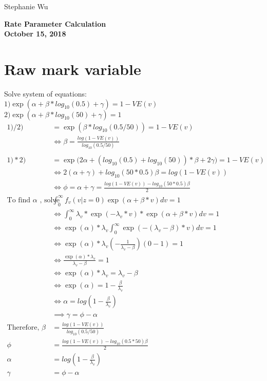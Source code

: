 \documentclass[10pt, letter]{article}
\begin{document}
\begin{flushleft}
\large{Stephanie Wu}
\end{flushleft}
\begin{center}
\large\textbf{Rate Parameter Calculation\\
October 15, 2018\\}
\end{center}

\section{Raw mark variable}
Solve system of equations:\\ 
$1) \exp(\alpha + \beta*log_{10}(0.5) + \gamma) = 1 - VE(v)$\\
$2) \exp(\alpha + \beta*log_{10}(50) + \gamma) = 1$\\
\begin{align*}
1)/ 2) &= \exp(\beta*log_{10}(0.5/50)) = 1-VE(v)\\
&\iff \beta = \frac{log(1-VE(v))}{log_{10}(0.5/50)}\\
\\
1)*2) &= \exp\Big(2\alpha + (log_{10}(0.5)+log_{10}(50))*\beta + 2\gamma\Big) = 1-VE(v)\\
&\iff 2(\alpha + \gamma) + log_{10}(50*0.5)\beta = log(1-VE(v))\\
&\iff \phi = \alpha + \gamma = \frac{log(1-VE(v)) - log_{10}(50*0.5)\beta}{2}\\
\text{To find } \alpha \text{ , solve } &\int_0^\infty f_v(v|z=0)\exp(\alpha+\beta*v)dv = 1\\
&\iff \int_0^\infty \lambda_v* \exp(-\lambda_v*v)*\exp(\alpha + \beta*v)dv = 1\\
&\iff \exp(\alpha)*\lambda_v \int_0^\infty\exp(-(\lambda_v - \beta)*v)dv = 1\\
&\iff \exp(\alpha)*\lambda_v (-\frac{1}{\lambda_v - \beta})(0 - 1) = 1\\
&\iff \frac{\exp(\alpha)*\lambda_v}{\lambda_v - \beta} = 1\\
&\iff \exp(\alpha)*\lambda_v = \lambda_v - \beta\\
&\iff \exp(\alpha) = 1 - \frac{\beta}{\lambda_v}\\
&\iff \alpha = log(1 - \frac{\beta}{\lambda_v})\\
&\implies \gamma = \phi - \alpha\\
\text{Therefore, } \beta &= \frac{log(1-VE(v))}{log_{10}(0.5/50)}\\
\phi &= \frac{log(1-VE(v)) - log_{10}(0.5*50)\beta}{2}\\
\alpha &= log(1 - \frac{\beta}{\lambda_v})\\
\gamma &= \phi - \alpha\\
\end{align*}
\end{document}
